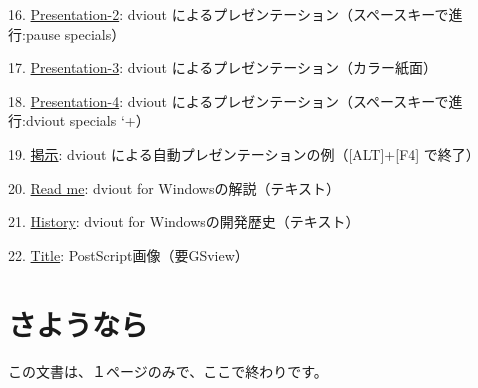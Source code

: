 16. \href{file:..\sample\slisamp2.dvi}{Presentation-2}: dviout によるプレゼンテーション（スペースキーで進行:pause specials）

17. \href{file:..\sample\slisamp3.dvi}{Presentation-3}: dviout によるプレゼンテーション（カラー紙面）

18. \href{file:..\sample\slisamp4.dvi}{Presentation-4}: dviout によるプレゼンテーション（スペースキーで進行:dviout specials `+）

19. \href{file:..\special\demo.dvi}{掲示}: dviout による自動プレゼンテーションの例（[ALT]+[F4] で終了）

20. \href{file:..\readme.txt}{Read me}: dviout for Windowsの解説（テキスト）

21. \href{file:..\history.txt}{History}: dviout for Windowsの開発歴史（テキスト）

22. \href{file:..\graphic\ps\sample2.ps}{Title}: PostScript画像（要GSview）

\section{さようなら}
この文書は、１ページのみで、ここで終わりです。


